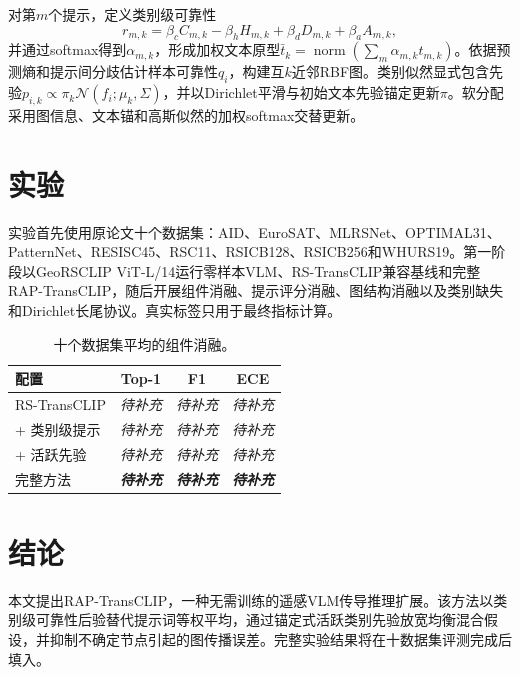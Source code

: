 \documentclass[10pt,twocolumn]{article}
\newcommand{\method}{RAP-TransCLIP}
\newcommand{\TBD}{\textit{待补充}}
\begin{document}
对第$m$个提示，定义类别级可靠性
\[
r_{m,k}=\beta_c C_{m,k}-\beta_hH_{m,k}+\beta_dD_{m,k}+\beta_aA_{m,k},
\]
并通过softmax得到$\alpha_{m,k}$，形成加权文本原型$\bar t_k=\operatorname{norm}(\sum_m\alpha_{m,k}t_{m,k})$。依据预测熵和提示间分歧估计样本可靠性$q_i$，构建互$k$近邻RBF图。类别似然显式包含先验$p_{i,k}\propto\pi_k\mathcal N(f_i;\mu_k,\Sigma)$，并以Dirichlet平滑与初始文本先验锚定更新$\pi$。软分配采用图信息、文本锚和高斯似然的加权softmax交替更新。

\section{实验}
实验首先使用原论文十个数据集：AID、EuroSAT、MLRSNet、OPTIMAL31、PatternNet、RESISC45、RSC11、RSICB128、RSICB256和WHURS19。第一阶段以GeoRSCLIP ViT-L/14运行零样本VLM、RS-TransCLIP兼容基线和完整RAP-TransCLIP，随后开展组件消融、提示评分消融、图结构消融以及类别缺失和Dirichlet长尾协议。真实标签只用于最终指标计算。

\begin{table}[H]
\centering
\caption{十个数据集平均的组件消融。}
\begin{tabular}{lccc}
\toprule
配置 & Top-1 & F1 & ECE\\
\midrule
RS-TransCLIP & \TBD & \TBD & \TBD\\
+ 类别级提示 & \TBD & \TBD & \TBD\\
+ 活跃先验 & \TBD & \TBD & \TBD\\
完整方法 & \textbf{\TBD} & \textbf{\TBD} & \textbf{\TBD}\\
\bottomrule
\end{tabular}
\end{table}

\section{结论}
本文提出\method，一种无需训练的遥感VLM传导推理扩展。该方法以类别级可靠性后验替代提示词等权平均，通过锚定式活跃类别先验放宽均衡混合假设，并抑制不确定节点引起的图传播误差。完整实验结果将在十数据集评测完成后填入。
\end{document}
